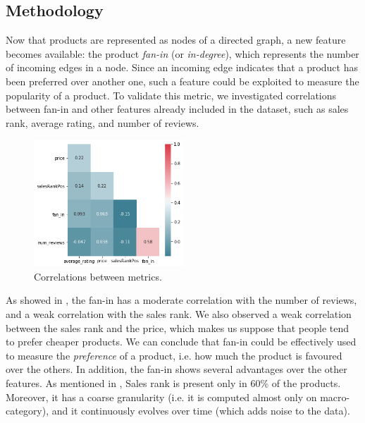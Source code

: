 \documentclass[11pt]{article}
\begin{document}
\subsection{Methodology}
Now that products are represented as nodes of a directed graph, a new feature becomes available: the product \emph{fan-in} (or \emph{in-degree}), which represents the number of incoming edges in a node. Since an incoming edge indicates that a product has been preferred over another one, such a feature could be exploited to measure the popularity of a product. To validate this metric, we investigated correlations between fan-in and other features already included in the dataset, such as sales rank, average rating, and number of reviews.
\begin{figure}
	\centering{}
	\includegraphics[width=0.5\textwidth]{img/faninCorr.png}
	\caption{Correlations between metrics.}
	\label{fig:faninCorr}
\end{figure}
As showed in , the fan-in has a moderate correlation with the number of reviews, and a weak correlation with the sales rank. We also observed a weak correlation between the sales rank and the price, which makes us suppose that people tend to prefer cheaper products. We can conclude that fan-in could be effectively used to measure the \textit{preference} of a product, i.e. how much the product is favoured over the others. In addition, the fan-in shows several advantages over the other features. As mentioned in , Sales rank is present only in 60\% of the products. Moreover, it has a coarse granularity (i.e. it is computed almost only on macro-category), and it continuously evolves over time (which adds noise to the data). 
\end{document}

